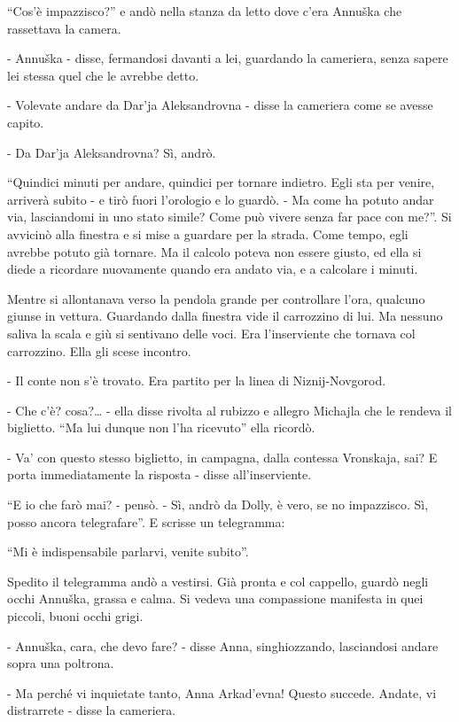 ``Cos'è impazzisco?'' e andò nella stanza da letto dove c'era Annuška che rassettava la camera. 

- Annuška - disse, fermandosi davanti a lei, guardando la cameriera, senza sapere lei stessa quel che le avrebbe detto. 

- Volevate andare da Dar'ja Aleksandrovna - disse la cameriera come se avesse capito. 

- Da Dar'ja Aleksandrovna? Sì, andrò. 

``Quindici minuti per andare, quindici per tornare indietro. Egli sta per venire, arriverà subito - e tirò fuori l'orologio e lo guardò. - Ma come ha potuto andar via, lasciandomi in uno stato simile? Come può vivere senza far pace con me?''. Si avvicinò alla finestra e si mise a guardare per la strada. Come tempo, egli avrebbe potuto già tornare. Ma il calcolo poteva non essere giusto, ed ella si diede a ricordare nuovamente quando era andato via, e a calcolare i minuti. 

Mentre si allontanava verso la pendola grande per controllare l'ora, qualcuno giunse in vettura. Guardando dalla finestra vide il carrozzino di lui. Ma nessuno saliva la scala e giù si sentivano delle voci. Era l'inserviente che tornava col carrozzino. Ella gli scese incontro. 

- Il conte non s'è trovato. Era partito per la linea di Niznij-Novgorod. 

- Che c'è? cosa?\ldots{} - ella disse rivolta al rubizzo e allegro Michajla che le rendeva il biglietto. ``Ma lui dunque non l'ha ricevuto'' ella ricordò. 

- Va' con questo stesso biglietto, in campagna, dalla contessa Vronskaja, sai? E porta immediatamente la risposta - disse all'inserviente. 

``E io che farò mai? - pensò. - Sì, andrò da Dolly, è vero, se no impazzisco. Sì, posso ancora telegrafare''. E scrisse un telegramma: 

``Mi è indispensabile parlarvi, venite subito''. 

Spedito il telegramma andò a vestirsi. Già pronta e col cappello, guardò negli occhi Annuška, grassa e calma. Si vedeva una compassione manifesta in quei piccoli, buoni occhi grigi. 

- Annuška, cara, che devo fare? - disse Anna, singhiozzando, lasciandosi andare sopra una poltrona. 

- Ma perché vi inquietate tanto, Anna Arkad'evna! Questo succede. Andate, vi distrarrete - disse la cameriera. 

